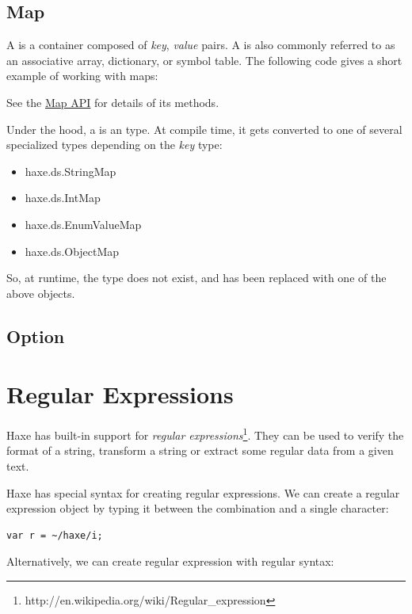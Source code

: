 \documentclass{haxe}
\begin{document}
\subsection{Map}
\label{std-Map}

A  is a container composed of \emph{key}, \emph{value} pairs.  A  is also commonly referred to as an associative array, dictionary, or symbol table.  The following code gives a short example of working with maps:


See the \href{http://api.haxe.org/haxe/Map.html}{Map API} for details of its methods.

Under the hood, a  is an  type.  At compile time, it gets converted to one of several specialized types depending on the \emph{key} type:
\begin{itemize}
	\item haxe.ds.StringMap
	\item haxe.ds.IntMap
	\item haxe.ds.EnumValueMap
	\item haxe.ds.ObjectMap
\end{itemize}
So, at runtime, the  type does not exist, and has been replaced with one of the above objects.  

\subsection{Option}
\label{std-Option}

\section{Regular Expressions}
\label{std-regex}

Haxe has built-in support for \emph{regular expressions}\footnote{http://en.wikipedia.org/wiki/Regular_expression}. They can be used to verify the format of a string, transform a string or extract some regular data from a given text.

Haxe has special syntax for creating regular expressions. We can create a regular expression object by typing it between the \expr{\textasciitilde/} combination and a single \expr{/} character:

\begin{lstlisting}
var r = ~/haxe/i;
\end{lstlisting}

Alternatively, we can create regular expression with regular syntax:
\end{document}
